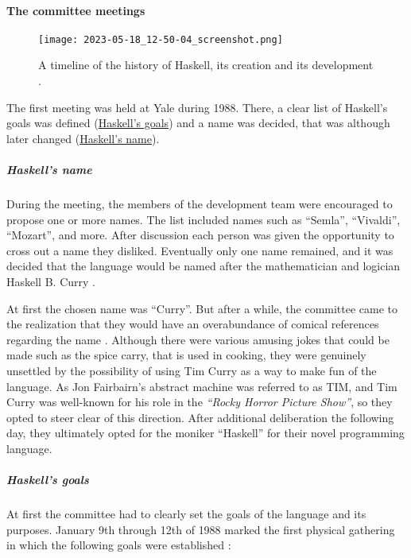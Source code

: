 \documentclass[a4paper, titlepage, twoside]{article}
\begin{document}
\paragraph*{The committee meetings}
\label{sec:orgb93c44f}

\begin{figure}[htbp]
\centering
\texttt{[image: 2023-05-18\_12-50-04\_screenshot.png]}
\caption{A timeline of the history of Haskell, its creation and its development \autocite{hudakHistoryHaskellBeing2007}.}
\end{figure}

The first meeting was held at Yale during 1988. There, a clear list of Haskell's goals was defined (\hyperref[sec:org65f1f1a]{Haskell's goals}) and a name was decided, that was although later changed (\hyperref[sec:org5636447]{Haskell's name}).

\subparagraph*{Haskell's name}
\label{sec:org5636447}

During the meeting, the members of the development team were encouraged to propose one or more names. The list included names such as ``Semla'', ``Vivaldi'', ``Mozart'', and more. After discussion each person was given the opportunity to cross out a name they disliked. Eventually only one name remained, and it was decided that the language would be named after the mathematician and logician Haskell B. Curry \autocite{hudakHistoryHaskellBeing2007}.

At first the chosen name was ``Curry''. But after a while, the committee came to the realization that they would have an overabundance of comical references regarding the name \autocite{hudakHistoryHaskellBeing2007}. Although there were various amusing jokes that could be made such as the spice carry, that is used in cooking, they were genuinely unsettled by the possibility of using Tim Curry as a way to make fun of the language.
As Jon Fairbairn's abstract machine was referred to as TIM, and Tim Curry was well-known for his role in the \emph{``Rocky Horror Picture Show''}, so they opted to steer clear of this direction. After additional deliberation the following day, they ultimately opted for the moniker ``Haskell'' for their novel programming language.

\subparagraph*{Haskell's goals}
\label{sec:org65f1f1a}

At first the committee had to clearly set the goals of the language and its purposes. January 9th through 12th of 1988 marked the first physical gathering in which the following goals were established \autocite{hudakHistoryHaskellBeing2007}:
\end{document}
